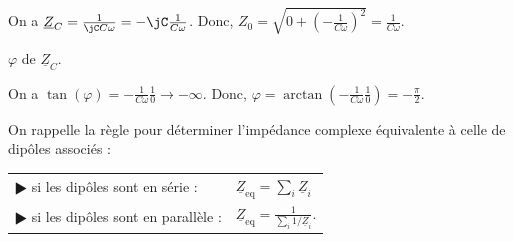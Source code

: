 \begin{corrige}
On a $\underline{Z}_C = \frac{1}{\jC C \omega} = -\jC\frac{1}{C \omega}$. Donc, $Z_0 = \sqrt{0 +  \left(-\frac{1}{C\omega}\right)^2} = \frac{1}{C\omega}$.
\end{corrige}



\begin{enonce}
	$\varphi$ de $\underline{Z}_C$.
\end{enonce}


\begin{corrige}
On a $\tan (\varphi) = -\frac{1}{C\omega}\frac{1}{0} \rightarrow -\infty$. Donc, $\varphi = \arctan \left(  -\frac{1}{C\omega}\frac{1}{0} \right) = -\frac{\pi}{2}$.
\end{corrige}


\finEntrainement







\hauteurLargeurCadreReponse		{12mm}{7cm}
\initialisationEntrainement

On rappelle la règle pour déterminer l'impédance complexe équivalente à celle de dipôles associés :
\begin{center}
\begin{tabular}{ll}
$\RHD$ si les dipôles sont en série :  &  $\underline{Z}_{\text{eq}} = \sum_i \underline{Z}_i$ \\
$\RHD$ si les dipôles sont en parallèle :  &  $\underline{Z}_{\text{eq}} = \frac{1}{\sum_i 1/\underline{Z}_i}$. 
\end{tabular}
\end{center}

